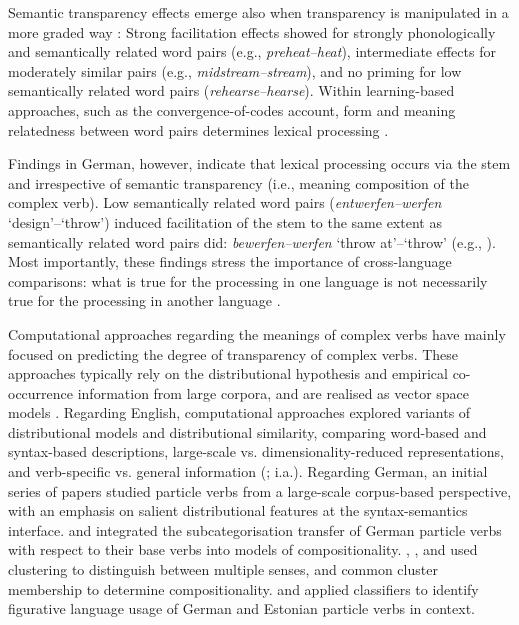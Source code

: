 \documentclass[output=paper]{langsci/langscibook}
\begin{document}
Semantic transparency effects emerge also when transparency is
manipulated in a more graded way \citep{GonnermanEtAl:07}: Strong
facilitation effects showed for strongly phonologically and
semantically related word pairs (e.g., \textit{preheat--heat}),
intermediate effects for moderately similar pairs (e.g.,
\textit{midstream--stream}), and no priming for low semantically
related word pairs (\textit{rehearse--hearse}). Within learning-based
approaches, such as the convergence-of-codes account, form and meaning
relatedness between word pairs determines lexical processing
\citep{Plaut/Gonnerman:00, GonnermanEtAl:07}.

Findings in German, however, indicate that lexical processing occurs via the stem and irrespective of semantic transparency
(i.e., meaning composition of the complex verb). Low semantically
related word pairs (\textit{entwerfen--werfen} `design'--`throw')
induced facilitation of the stem to the same extent as semantically
related word pairs did: \textit{bewerfen--werfen} `throw at'--`throw'
(e.g., \citealt{SmolkaEtAl:09, SmolkaEtAl:14, SmolkaEtAl:15,
  SmolkaEtAl:18}). Most importantly, these findings stress the
importance of cross-language comparisons: what is true for the
processing in one language is not necessarily true for the processing
in another language \citep{GuentherEtAl:18}.

Computational approaches regarding the meanings of complex verbs have
mainly focused on predicting the degree of transparency of complex
verbs. These approaches typically rely on the distributional
hypothesis \citep{Harris:54,Firth:57} and empirical co-occurrence
information from large corpora, and are realised as vector space
models \citep{Turney/Pantel:10}. Regarding English, computational
approaches explored variants of distributional models and
distributional similarity, comparing word-based and syntax-based
descriptions, large-scale vs. dimensionality-reduced representations,
and verb-specific vs. general information
(\citealt{BaldwinEtAl:03,McCarthyEtAl:03,Bannard:05,Cook/Stevenson:06}; i.a.).
Regarding German, an initial series of papers
\citep{Aldinger:04,SchulteImWalde:04a,SchulteImWalde:05,SchulteImWalde:06c}
studied particle verbs from a large-scale corpus-based perspective,
with an emphasis on salient distributional features at the
syntax-semantics interface. \cite{SchulteImWalde:06c} and
\cite{Bott/SchulteImWalde:18} integrated the subcategorisation
transfer of German particle verbs with respect to their base verbs
into models of
compositionality. \cite{Kuehner/SchulteImWalde:10}, \cite{Bott/SchulteImWalde:17},  and \cite{Koeper/SchulteImWalde:17a}
used clustering to distinguish between multiple senses, and common
cluster membership to determine
compositionality. \cite{Koeper/SchulteImWalde:16b} and
\cite{AedmaaEtAl:18} applied classifiers to identify figurative
language usage of German and Estonian particle verbs in context.
\end{document}
